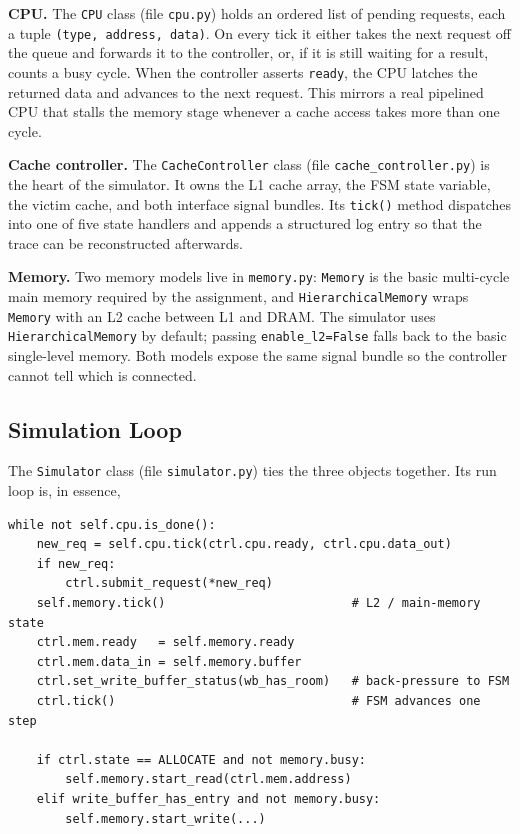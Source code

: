 \documentclass[11pt,a4paper]{article}
\begin{document}
\textbf{CPU.} The \texttt{CPU} class (file \texttt{cpu.py}) holds an ordered
list of pending requests, each a tuple \texttt{(type, address, data)}. On
every tick it either takes the next request off the queue and forwards it to
the controller, or, if it is still waiting for a result, counts a busy cycle.
When the controller asserts \texttt{ready}, the CPU latches the returned data
and advances to the next request. This mirrors a real pipelined CPU that
stalls the memory stage whenever a cache access takes more than one cycle.

\textbf{Cache controller.} The \texttt{CacheController} class
(file \texttt{cache\_controller.py}) is the heart of the simulator. It owns
the L1 cache array, the FSM state variable, the victim cache, and both
interface signal bundles. Its \texttt{tick()} method dispatches into one of
five state handlers and appends a structured log entry so that the trace can
be reconstructed afterwards.

\textbf{Memory.} Two memory models live in \texttt{memory.py}:
\texttt{Memory} is the basic multi-cycle main memory required by the
assignment, and \texttt{HierarchicalMemory} wraps \texttt{Memory} with an L2
cache between L1 and DRAM. The simulator uses \texttt{HierarchicalMemory} by
default; passing \texttt{enable\_l2=False} falls back to the basic single-level
memory. Both models expose the same signal bundle so the controller cannot
tell which is connected.

\subsection{Simulation Loop}

The \texttt{Simulator} class (file \texttt{simulator.py}) ties the three
objects together. Its run loop is, in essence,

\begin{lstlisting}
while not self.cpu.is_done():
    new_req = self.cpu.tick(ctrl.cpu.ready, ctrl.cpu.data_out)
    if new_req:
        ctrl.submit_request(*new_req)
    self.memory.tick()                          # L2 / main-memory state
    ctrl.mem.ready   = self.memory.ready
    ctrl.mem.data_in = self.memory.buffer
    ctrl.set_write_buffer_status(wb_has_room)   # back-pressure to FSM
    ctrl.tick()                                 # FSM advances one step

    if ctrl.state == ALLOCATE and not memory.busy:
        self.memory.start_read(ctrl.mem.address)
    elif write_buffer_has_entry and not memory.busy:
        self.memory.start_write(...)
\end{lstlisting}
\end{document}
